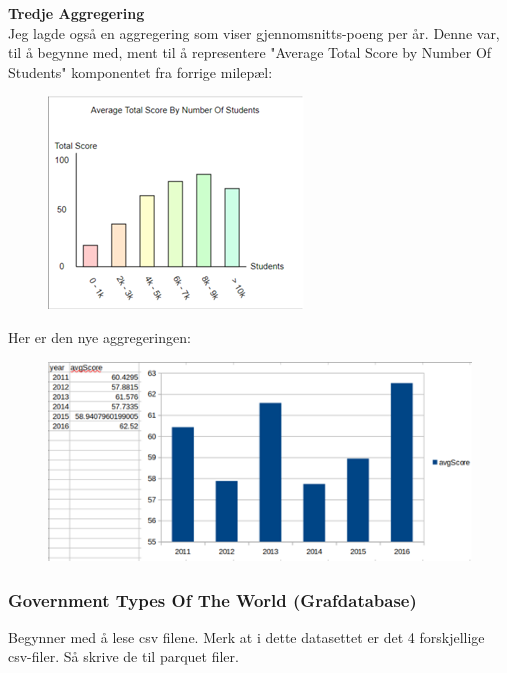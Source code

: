 \textbf{Tredje Aggregering}\\
Jeg lagde også en aggregering som viser gjennomsnitts-poeng per år. Denne var, til å begynne med, ment til å representere "Average Total Score by Number Of Students" komponentet fra forrige milepæl:

\FigureCounter
\begin{figure}[H]
    \includegraphics[width=\textwidth]{images/milepael5/avgScoreTotStudents.png}
\end{figure}

Her er den nye aggregeringen:

\FigureCounter
\begin{figure}[H]
    \includegraphics[width=\textwidth]{images/milepael5/avgScoreTotStudentsActual.png}
\end{figure}

\subsubsection{Government Types Of The World (Grafdatabase)}
Begynner med å lese csv filene. Merk at i dette datasettet er det 4 forskjellige csv-filer. Så skrive de til parquet filer.


